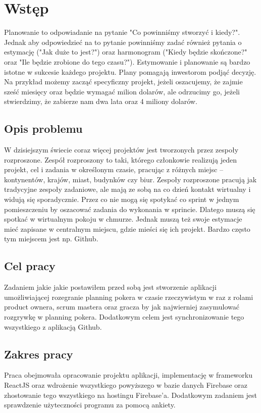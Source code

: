 \chapter*{Wstęp}

Planowanie to odpowiadanie na pytanie "Co powinniśmy stworzyć i kiedy?". Jednak aby odpowiedzieć na to pytanie powinniśmy zadać również pytania o estymację ("Jak duże to jest?") oraz harmonogram ("Kiedy będzie skończone?" oraz "Ile będzie zrobione do tego czasu?"). Estymowanie i planowanie są bardzo istotne w sukcesie każdego projektu. Plany pomagają inwestorom podjąć decyzję. Na przykład możemy zacząć specyficzny projekt, jeżeli oszacujemy, że zajmie sześć miesięcy oraz będzie wymagać milion dolarów, ale odrzucimy go, jeżeli stwierdzimy, że zabierze nam dwa lata oraz 4 miliony dolarów.\cite{Cohen_2006}

\section*{Opis problemu}

W dzisiejszym świecie coraz więcej projektów jest tworzonych przez zespoły rozproszone. Zespół rozproszony to taki, którego członkowie realizują jeden projekt, cel i zadania w określonym czasie, pracując z różnych miejsc – kontynentów, krajów, miast, budynków czy biur. Zespoły rozproszone pracują jak tradycyjne zespoły zadaniowe, ale mają ze sobą na co dzień kontakt wirtualny i widują się sporadycznie.\cite{www_rozproszony} Przez co nie mogą się spotykać co sprint w jednym pomieszczeniu by oszacować zadania do wykonania w sprincie. Dlatego muszą się spotkać w wirtualnym pokoju w chmurze. Jednak muszą też swoje estymacje mieć zapisane w centralnym miejscu, gdzie mieści się ich projekt. Bardzo często tym miejscem jest np. Github.

\section*{Cel pracy}

Zadaniem jakie jakie postawiłem przed sobą jest stworzenie aplikacji umożliwiającej rozegranie planning pokera w czasie rzeczywistym w raz z rolami product ownera, scrum mastera oraz gracza by jak najwierniej zasymulować rozgrywkę w planning pokera. Dodatkowym celem jest synchronizowanie tego wszystkiego z aplikacją Github.

\section*{Zakres pracy}

Praca obejmowała opracowanie projektu aplikacji, implementację w frameworku ReactJS oraz wdrożenie wszystkiego powyższego w bazie danych Firebase oraz zhostowanie tego wszystkiego na hostingu Firebase'a. Dodatkowym zadaniem jest sprawdzenie użyteczności programu za pomocą ankiety.

